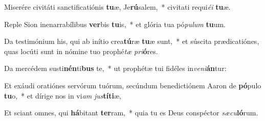 \item Miserére civitáti sanctificatiónis \textbf{tu}æ, Je\textbf{rú}salem,~* civitati requi\textit{é}\textit{i} \textbf{tu}æ.
\item Reple Sion inenarrabílibus \textbf{ver}bis \textbf{tu}is,~* et glória tua pó\textit{pu}\textit{lum} \textbf{tu}um.
\item Da testimónium his, qui ab inítio crea\textbf{tú}ræ \textbf{tu}æ sunt,~* et súscita prædicatiónes, quas locúti sunt in nómine tuo prophé\textit{tæ} \textit{pri}\textbf{ó}res.
\item Da mercédem susti\textbf{nén}ti\textbf{bus} te,~* ut prophétæ tui fidéles in\textit{ve}\textit{ni}\textbf{án}tur:
\item Et exáudi oratiónes servórum tuórum, secúndum benedictiónem Aaron de \textbf{pó}pulo \textbf{tu}o,~* et dírige nos in vi\textit{am} \textit{jus}\textbf{tí}\textbf{ti}æ,
\item Et sciant omnes, qui \textbf{há}bitant \textbf{ter}ram,~* quia tu es Deus conspéctor \textit{sæ}\textit{cu}\textbf{ló}rum.
